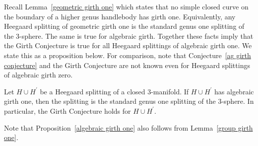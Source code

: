 Recall Lemma~\ref{geometric girth one} which states that no simple closed curve on the boundary of a higher genus handlebody has girth one.  Equivalently, any Heegaard splitting of geometric girth one is the standard genus one splitting of the 3-sphere.  The same is true for algebraic girth.  Together these facts imply that the Girth Conjecture is true for all Heegaard splittings of algebraic girth one.  We state this as a proposition below.  For comparison, note that Conjecture~\ref{ag girth conjecture} and the Girth Conjecture are not known even for Heegaard splittings of algebraic girth zero.

\begin{proposition}
\label{algebraic girth one}
Let $H\cup H^\prime$ be a Heegaard splitting of a closed 3-manifold.  If $H\cup H^\prime$ has algebraic girth one, then the splitting is the standard genus one splitting of the 3-sphere.  In particular, the Girth Conjecture holds for $H\cup H^\prime$.
\end{proposition}

Note that Proposition~\ref{algebraic girth one} also follows from Lemma~\ref{group girth one}.

